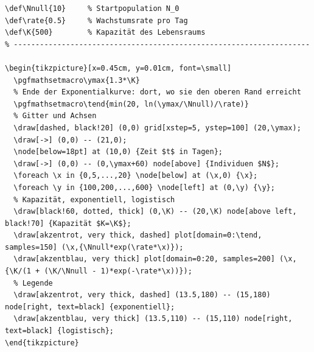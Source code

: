 \begin{lstlisting}[style=latex]
% ---- Parameter -----------------------------------------------------
\def\Nnull{10}     % Startpopulation N_0
\def\rate{0.5}     % Wachstumsrate pro Tag
\def\K{500}        % Kapazität des Lebensraums
% --------------------------------------------------------------------

\begin{tikzpicture}[x=0.45cm, y=0.01cm, font=\small]
  \pgfmathsetmacro\ymax{1.3*\K}
  % Ende der Exponentialkurve: dort, wo sie den oberen Rand erreicht
  \pgfmathsetmacro\tend{min(20, ln(\ymax/\Nnull)/\rate)}
  % Gitter und Achsen
  \draw[dashed, black!20] (0,0) grid[xstep=5, ystep=100] (20,\ymax);
  \draw[->] (0,0) -- (21,0);
  \node[below=18pt] at (10,0) {Zeit $t$ in Tagen};
  \draw[->] (0,0) -- (0,\ymax+60) node[above] {Individuen $N$};
  \foreach \x in {0,5,...,20} \node[below] at (\x,0) {\x};
  \foreach \y in {100,200,...,600} \node[left] at (0,\y) {\y};
  % Kapazität, exponentiell, logistisch
  \draw[black!60, dotted, thick] (0,\K) -- (20,\K) node[above left, black!70] {Kapazität $K=\K$};
  \draw[akzentrot, very thick, dashed] plot[domain=0:\tend, samples=150] (\x,{\Nnull*exp(\rate*\x)});
  \draw[akzentblau, very thick] plot[domain=0:20, samples=200] (\x,{\K/(1 + (\K/\Nnull - 1)*exp(-\rate*\x))});
  % Legende
  \draw[akzentrot, very thick, dashed] (13.5,180) -- (15,180) node[right, text=black] {exponentiell};
  \draw[akzentblau, very thick] (13.5,110) -- (15,110) node[right, text=black] {logistisch};
\end{tikzpicture}
\end{lstlisting}

